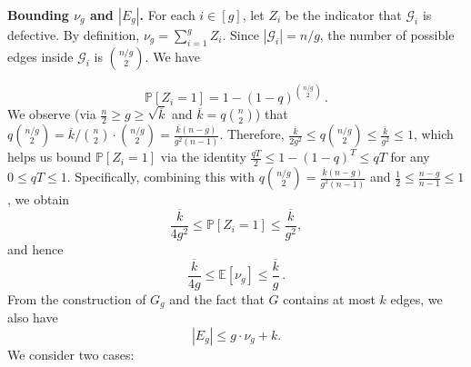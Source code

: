 \documentclass[journal]{IEEEtran}
\theoremstyle{definition}
\theoremstyle{definition}
\newcommand{\Gc}{\mathcal{G}}
\newcommand{\EE}{\mathbb{E}}
\newcommand{\PP}{\mathbb{P}}
\newcommand{\PV}{\nu}
\newcommand{\kb}{\overline{k}}
\begin{document}
 

\smallskip
\textbf{Bounding $\PV_g$ and $|E_g|$.}  
For each $i \in [g]$, let $Z_i$ be the indicator that $\Gc_i$ is defective.  
By definition, $\PV_g = \sum_{i=1}^g Z_i$.  
Since $|\Gc_i| = n/g$, the number of possible edges inside $\Gc_i$ is $\binom{n/g}{2}$. We have

\[
\PP[Z_i = 1] =  1 - (1-q)^{\binom{n/g}{2}} \, .
\]
We observe (via $\frac{n}{2} \ge g \ge \sqrt{\kb}$ and $\kb = q{n \choose 2}$) that $q \binom{n/g}{2} = \kb/\binom{n}{2} \cdot \binom{n/g}{2} = \frac{\kb(n-g)}{g^2(n-1)}$. Therefore,  $ \frac{\kb}{2g^2} \le q \binom{n/g}{2} \le \frac{\kb}{g^2} \le 1$, which helps us bound $\PP[Z_i = 1]$ via the identity \( \frac{qT}{2} \leq 1 - (1-q)^{T} \leq qT  \) for any $0\leq qT \leq 1$. Specifically, combining this with $q \binom{n/g}{2} = \frac{\kb(n-g)}{g^2(n-1)}$ and $\frac{1}{2} \le \frac{n-g}{n-1} \le 1$, we obtain
\begin{equation}
     \label{eq:bound_prob_defective}
     \frac{\kb}{4g^2} \leq \PP[Z_i=1] \leq \frac{\kb}{g^2},
\end{equation}
and hence
\begin{equation}
  \label{eq:expected_PV}
     \frac{\kb}{4g} \leq \EE[\PV_g] \leq \frac{\kb}{g} \, .
\end{equation}
From the construction of $G_g$ and the fact that $G$ contains at most $k$ edges, we also have
\begin{equation}
  \label{eq:number_defective_pairs}
  |E_g| \leq g \cdot \PV_g + k. 
\end{equation}
We consider two cases:
\end{document}
